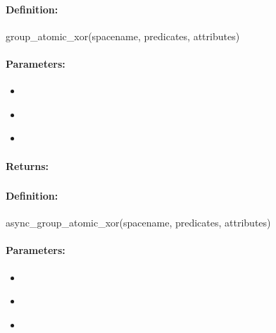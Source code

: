 \paragraph{Definition:}
\begin{rubycode}
group_atomic_xor(spacename, predicates, attributes)
\end{rubycode}

\paragraph{Parameters:}
\begin{itemize}[noitemsep]
\item {}\\

\item {}\\

\item {}\\

\end{itemize}

\paragraph{Returns:}


\pagebreak
\subsubsection{}
\label{api:ruby:async_group_atomic_xor}


\paragraph{Definition:}
\begin{rubycode}
async_group_atomic_xor(spacename, predicates, attributes)
\end{rubycode}

\paragraph{Parameters:}
\begin{itemize}[noitemsep]
\item {}\\

\item {}\\

\item {}\\

\end{itemize}

